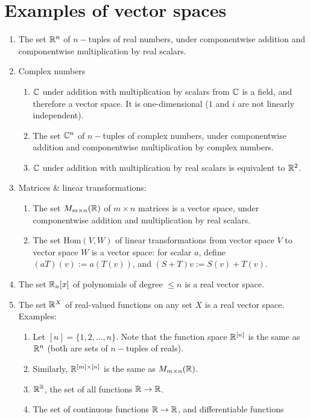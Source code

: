 \newpage
\section{Examples of vector spaces}
\begin{enumerate}
\item The set $\mathbb{R}^n$ of $n-$tuples of real numbers, under componentwise addition and componentwise
  multiplication by real scalars.
\item Complex numbers
  \begin{enumerate}
  \item $\mathbb{C}$ under addition with multiplication by scalars from $\mathbb{C}$ is a field, and therefore a
    vector space. It is one-dimensional ($1$ and $i$ are not linearly independent).
  \item The set $\mathbb{C}^n$ of $n-$tuples of complex numbers, under componentwise addition and
    componentwise multiplication by complex numbers.
  \item $\mathbb{C}$ under addition with multiplication by real scalars is equivalent to $\mathbb{R}^2$.
  \end{enumerate}
\item Matrices \& linear transformations:
  \begin{enumerate}
  \item The set $M_{m \times n}(\mathbb{R})$ of $m\times n$ matrices is a vector space, under componentwise
    addition and multiplication by real scalars.
  \item The set $\mathrm{Hom}(V, W)$ of linear transformations from vector space $V$ to vector
    space $W$ is a vector space: for scalar $a$, define $(aT)(v) := a(T(v))$, and
    $(S + T)v := S(v) + T(v)$.
  \end{enumerate}
\item The set $\mathbb{R}_n[x]$ of polynomials of degree $\leq n$ is a real vector
  space.
\item The set $\mathbb{R}^X$ of real-valued functions on any set $X$ is a real vector
  space. Examples:
  \begin{enumerate}
  \item Let $[n] = \{1, 2, \ldots, n\}$. Note that the function space $\mathbb{R}^{[n]}$ is
    the same as $\mathbb{R}^n$ (both are sets of $n-$tuples of reals).
  \item Similarly, $\mathbb{R}^{[m]\times[n]}$ is the same as $M_{m \times n}(\mathbb{R})$.
  \item $\mathbb{R}^{\mathbb{R}}$, the set of all functions $\mathbb{R}\to\mathbb{R}$.
  \item The set of continuous functions $\mathbb{R} \to \mathbb{R}$, and differentiable functions

\end{enumerate}
\end{enumerate}
